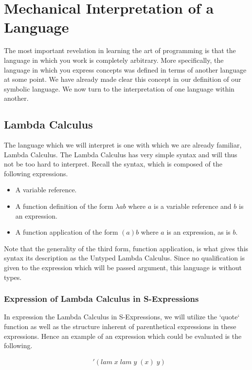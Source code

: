 
\chapter{Mechanical Interpretation of a Language}
The most important revelation in learning the art of programming is that the 
language in which you work is completely arbitrary. More specifically, the 
language in which you express concepts was defined in terms of another language 
at some point. We have already made clear this concept in our definition of our 
symbolic language. We now turn to the interpretation of one language within 
another.

\section{Lambda Calculus}
The language which we will interpret is one with which we are already familiar, 
Lambda Calculus. The Lambda Calculus has very simple syntax and will thus not 
be too hard to interpret. Recall the syntax, which is composed of the following 
expressions.

\begin{itemize}
  \item A variable reference.
  \item A function definition of the form $\lambda a b$ where $a$ is a variable reference and $b$ is an expression.
  \item A function application of the form $(a)b$ where $a$ is an expression, as is $b$.
\end{itemize}

Note that the generality of the third form, function application, is what gives 
this syntax its description as the Untyped Lambda Calculus. Since no 
qualification is given to the expression which will be passed argument, this 
language is without types.

\subsection{Expression of Lambda Calculus in S-Expressions}
In expression the Lambda Calculus in S-Expressions, we will utilize the `quote` 
function as well as the structure inherent of parenthetical expressions in these 
expressions. Hence an example of an expression which could be evaluated is the 
following.

\begin{align*}
& '(lam \; x \; lam \; y \; (x) \; y)
\end{align*}

